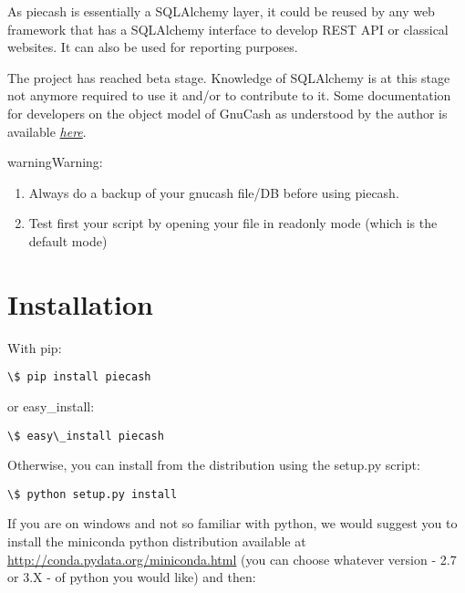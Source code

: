 \documentclass[letterpaper,10pt,english]{sphinxmanual}
\begin{document}
As piecash is essentially a SQLAlchemy layer, it could be reused by any web framework that has a SQLAlchemy interface to develop
REST API or classical websites. It can also be used for reporting purposes.

The project has reached beta stage. Knowledge of SQLAlchemy is at this stage not anymore required to use it and/or
to contribute to it. Some documentation for developers on the object model of GnuCash as understood by the author is
available {\hyperref[object_model::doc]{\emph{here}}}.

\begin{notice}{warning}{Warning:}\begin{enumerate}
\item {} 
Always do a backup of your gnucash file/DB before using piecash.

\item {} 
Test first your script by opening your file in readonly mode (which is the default mode)

\end{enumerate}
\end{notice}


\section{Installation}
\label{doc/doc:installation}
With pip:

\begin{Verbatim}[commandchars=\\\{\}]
\$ pip install piecash
\end{Verbatim}

or easy\_install:

\begin{Verbatim}[commandchars=\\\{\}]
\$ easy\_install piecash
\end{Verbatim}

Otherwise, you can install from the distribution using the setup.py script:

\begin{Verbatim}[commandchars=\\\{\}]
\$ python setup.py install
\end{Verbatim}

If you are on windows and not so familiar with python, we would suggest you to install the miniconda python distribution
available at \href{http://conda.pydata.org/miniconda.html}{http://conda.pydata.org/miniconda.html} (you can choose whatever version - 2.7 or 3.X - of python you would like)
and then:
\end{document}
